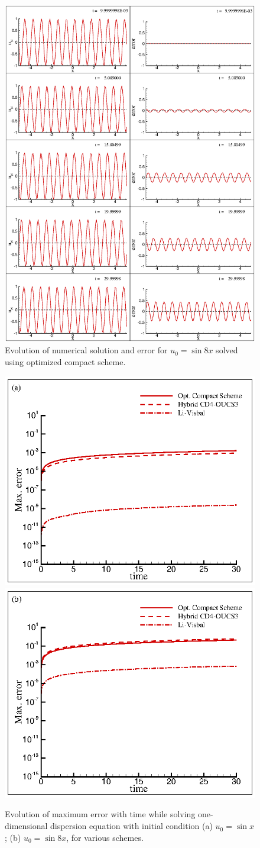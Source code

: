 \documentclass{svjour3}                    %
\begin{document}
\begin{figure}[!h]
\center
\includegraphics[width=0.8\linewidth]{Fig_9}
\caption{Evolution of numerical solution and error for $u_0=\sin 8x$ solved using optimized compact scheme.}
\label{fig:mid1}
\end{figure}

\begin{figure}
\center
\includegraphics[width=0.48\linewidth]{Fig_10a}
\includegraphics[width=0.48\linewidth]{Fig_10b}
\caption{Evolution of maximum error with time while solving one-dimensional dispersion equation with initial condition (a) $u_0=\sin x$ ; (b) $u_0=\sin 8x$, for various schemes.}
\label{fig:phase_err}
\end{figure}
\end{document}
